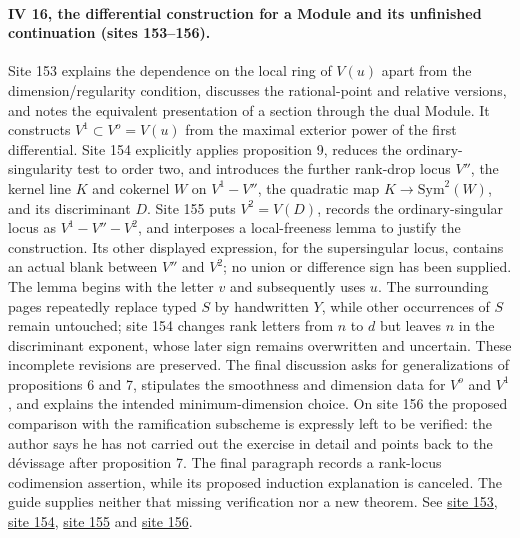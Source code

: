 \documentclass[10pt,a4paper]{article}
\begin{document}
\paragraph{IV 16, the differential construction for a Module and its unfinished continuation (sites 153--156).}
Site 153 explains the dependence on the local ring of $V(u)$ apart from the dimension/regularity condition, discusses the rational-point and relative versions, and notes the equivalent presentation of a section through the dual Module. It constructs $V^1\subset V^o=V(u)$ from the maximal exterior power of the first differential. Site 154 explicitly applies proposition 9, reduces the ordinary-singularity test to order two, and introduces the further rank-drop locus $V''$, the kernel line $K$ and cokernel $W$ on $V^1-V''$, the quadratic map $K\longrightarrow\mathrm{Sym}^2(W)$, and its discriminant $D$. Site 155 puts $V^2=V(D)$, records the ordinary-singular locus as $V^1-V''-V^2$, and interposes a local-freeness lemma to justify the construction. Its other displayed expression, for the supersingular locus, contains an actual blank between $V''$ and $V^2$; no union or difference sign has been supplied. The lemma begins with the letter $v$ and subsequently uses $u$. The surrounding pages repeatedly replace typed $S$ by handwritten $Y$, while other occurrences of $S$ remain untouched; site 154 changes rank letters from $n$ to $d$ but leaves $n$ in the discriminant exponent, whose later sign remains overwritten and uncertain. These incomplete revisions are preserved. The final discussion asks for generalizations of propositions 6 and 7, stipulates the smoothness and dimension data for $V^o$ and $V^1$, and explains the intended minimum-dimension choice. On site 156 the proposed comparison with the ramification subscheme is expressly left to be verified: the author says he has not carried out the exercise in detail and points back to the dévissage after proposition 7. The final paragraph records a rank-locus codimension assertion, while its proposed induction explanation is canceled. The guide supplies neither that missing verification nor a new theorem. See \href{https://grothendieck.umontpellier.fr/web/viewer.html?file=../25.pdf#page=154}{site 153}, \href{https://grothendieck.umontpellier.fr/web/viewer.html?file=../25.pdf#page=155}{site 154}, \href{https://grothendieck.umontpellier.fr/web/viewer.html?file=../25.pdf#page=156}{site 155} and \href{https://grothendieck.umontpellier.fr/web/viewer.html?file=../25.pdf#page=157}{site 156}.
\par{}
\end{document}
